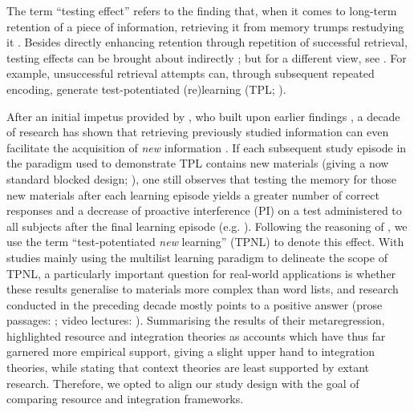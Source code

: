 \documentclass[../main.tex]{subfiles}
\begin{document}
The term ``testing effect'' refers to the finding that, when it comes to 
long-term retention of a piece of information, retrieving it from memory 
trumps restudying it 
\citep{karpickeCriticalImportanceRetrieval2008,roedigeriiiPowerTestingMemory2006,
 roedigeriiiTestEnhancedLearningTaking2006, rowlandEffectTestingRestudy2014, 
adesopeRethinkingUseTests2017, roedigeriiiCriticalRoleRetrieval2011, 
gloverTestingPhenomenonNot1989}. Besides directly enhancing retention 
through repetition of successful retrieval, testing effects can be brought 
about indirectly \citealp{arnoldTestpotentiatedLearningDistinguishing2013, 
roedigeriiiPowerTestingMemory2006}; but for a different view, see 
\citealp{kornellRetrievalAttemptsEnhance2015}. For example, unsuccessful 
retrieval attempts can, through subsequent repeated encoding, generate 
test-potentiated (re)learning (TPL;
\citealp{izawaReinforcementTestSequencesPairedAssociate1966,izawaOptimalPotentiatingEffects1970,
 kornellUnsuccessfulRetrievalAttempts2009, arnoldFreeRecallEnhances2013, 
arnoldTestpotentiatedLearningDistinguishing2013, 
wissmanTestpotentiatedLearningThree2018}).

After an initial impetus provided by 
\cite{szpunarTestingStudyInsulates2008}, who built upon earlier findings 
\citep{darleyEffectsPriorFree1971, tulvingNegativeTransferEffects1974}, a 
decade of research has shown that retrieving previously studied information 
can even facilitate the acquisition of \textit{new} information 
\citep{chanRetrievalPotentiatesNew2018, 
pastotterRetrievalPracticeEnhances2014, yangEnhancingLearningRetrieval2018}. 
If each subsequent study episode in the paradigm used to demonstrate TPL 
contains new materials (giving a now standard blocked design; 
\citealp{chanTestingPotentiatesNew2018}), one still observes that testing 
the memory for those new materials after each learning episode yields a 
greater number of correct responses and a decrease of proactive interference 
(PI) on a test administered to all subjects after the final learning episode 
(e.g. \citealp{szpunarInterpolatedMemoryTests2013, 
szpunarTestingStudyInsulates2008, wissmanInterimTestEffect2011}). Following 
the reasoning of \cite{chanRetrievalPotentiatesNew2018}, we use the term 
``test-potentiated \textit{new} learning'' (TPNL) to denote this effect.
With studies mainly using the multilist learning paradigm to delineate the 
scope of TPNL, a particularly important question for real-world applications 
is whether these results generalise to materials more complex than word 
lists, and research conducted in the preceding decade mostly points to a 
positive answer (prose passages: \citealp{wissmanInterimTestEffect2011, 
divisRetrievalSpeedsContext2014}; video lectures: 
\citealp{szpunarInterpolatedMemoryTests2013, 
jingInterpolatedTestingInfluences2016}). Summarising the results of their 
metaregression, \cite{chanRetrievalPotentiatesNew2018} highlighted resource 
and integration theories as accounts which have thus far garnered more 
empirical support, giving a slight upper hand to integration theories, while 
stating that context theories are least supported by extant research. 
Therefore, we opted to align our study design with the goal of comparing 
resource and integration frameworks.
\end{document}
